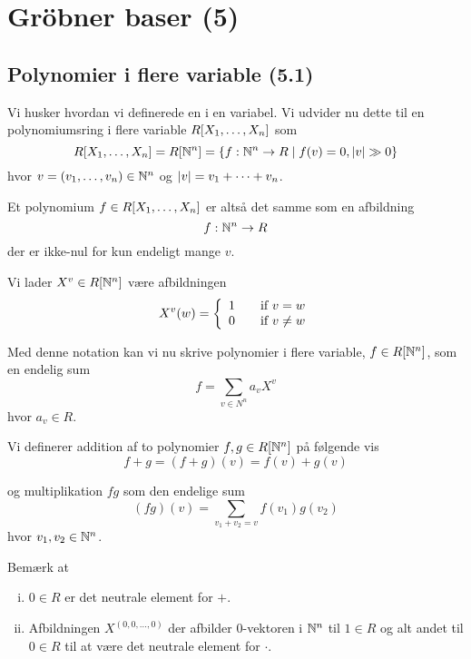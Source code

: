 \section{Gröbner baser (5)}
\subsection{Polynomier i flere variable (5.1)}
\label{Polynomier i flere variable (5.1)}
Vi husker hvordan vi definerede en  i en variabel. Vi
udvider nu dette til en polynomiumsring i flere variable $R[X_1,\ldots,X_n]$
som
\begin{equation*}
  R[X_1,\ldots,X_n] = R[\mathbb{N}^n] = 
  \{ f : \mathbb{N}^n \to R \mid f(v) = 0, \left | v \right | \gg 0 \}
\end{equation*}
hvor $v = (v_1,\ldots,v_n) \in \mathbb{N}^n$ og $\left | v \right | = v_1 + \cdots + v_n$.

Et polynomium $f \in R[X_1,\ldots,X_n]$ er altså det samme som en afbildning
\begin{equation*}
  f: \mathbb{N}^n \to R
\end{equation*}
der er ikke-nul for kun endeligt mange $v$.

Vi lader $X^v \in R[\mathbb{N}^n]$ være afbildningen
\begin{equation*}
  X^v(w) =  
  \left\{ 
  \begin{array}{l l}
    1 & \quad \text{if $v = w$}\\
    0 & \quad \text{if $v \neq w$}\\
  \end{array} \right.
\end{equation*}

Med denne notation kan vi nu skrive polynomier i flere variable, $f \in
R[\mathbb{N}^n]$, som en endelig sum
\begin{equation*}
  f = \sum_{v \in N^n} a_v X^v
\end{equation*}
hvor $a_v \in R$.

Vi definerer addition af to polynomier $f, g \in R[\mathbb{N}^n]$ på følgende vis
\begin{equation*}
  f + g = (f + g)(v) = f(v) + g(v)
\end{equation*}

og multiplikation $fg$ som den endelige sum
\begin{equation*}
  (fg)(v) = \sum_{v_1 + v_2 = v} f(v_1) g(v_2)
\end{equation*}
hvor $v_1, v_2 \in \mathbb{N}^n$.

Bemærk at
\begin{enumerate}[(i)]
  \item $0 \in R$ er det neutrale element for $+$.
  \item Afbildningen $X^{(0,0,\ldots,0)}$ der afbilder 0-vektoren i $\mathbb{N}^n$ til
  $1 \in R$ og alt andet til $0 \in R$ til at være det neutrale element for
  $\cdot$.
\end{enumerate}

